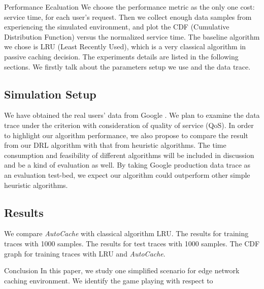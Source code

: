 \documentclass{article}
\begin{document}
\begin{section}{Performance Ecaluation}
    \label{exp}
    We choose the performance metric as the only one cost: service time, for each user's request. Then we collect enough data samples from experiencing the simulated environment, and plot the CDF (Cumulative Distribution Function) versus the normalized service time.
    The baseline algorithm we chose is LRU (Least Recently Used), which is a very classical algorithm in passive caching decision.
    The experiments details are listed in the following sections. We firstly talk about the parameters setup we use and the data trace.

    \subsection{Simulation Setup}
    We have obtained the real users' data from Google \cite{clusterdata:Reiss2011}. We plan to examine the data trace under the criterion with consideration of quality of service (QoS). In order to highlight our algorithm performance, we also propose to compare the result from our DRL algorithm with that from heuristic algorithms. The time consumption and feasibility of different algorithms will be included in discussion and be a kind of evaluation as well. By taking Google production data trace as an evaluation test-bed, we expect our algorithm could outperform other simple heuristic algorithms.

    \subsection{Results}
    We compare \textit{AutoCache} with classical algorithm LRU.
    The results for training traces with 1000 samples.
    The results for test traces with 1000 samples.
    The CDF graph for training traces with LRU and \textit{AutoCache}.
\end{section}

\begin{section}{Conclusion}
    \label{summary}
    In this paper, we study one simplified scenario for edge network caching environment.
    We identify the game playing with respect to 
\end{section}




\end{document}
